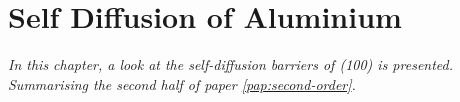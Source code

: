 \chapter{Self Diffusion of Aluminium}
\label{chap:al}

\textit{In this chapter, a look at the self-diffusion barriers of (100) is presented.
Summarising the second half of paper \ref{pap:second-order}.}




